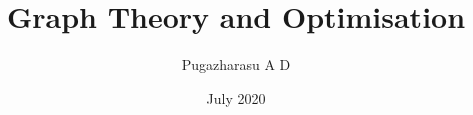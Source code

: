 \documentclass[a4paper,12pt]{book}
\begin{document}
\author{Pugazharasu A D}
\title{Graph Theory and Optimisation}
\date{July 2020}

\frontmatter
\maketitle
\tableofcontents

\mainmatter



\backmatter
\end{document}
